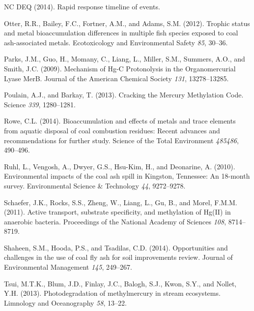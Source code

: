 \documentclass[ms]{uncgdissertationexp}
\theoremstyle{plain}
\theoremstyle{definition}
\theoremstyle{remark}
\begin{document}
  \hypertarget{ref-ncdeqRapidResponseTimeline2014}{}
  NC DEQ (2014). Rapid response timeline of events.
  
  \hypertarget{ref-otterTrophicStatusMetal2012}{}
  Otter, R.R., Bailey, F.C., Fortner, A.M., and Adams, S.M. (2012).
  Trophic status and metal bioaccumulation differences in multiple fish
  species exposed to coal ash-associated metals. Ecotoxicology and
  Environmental Safety \emph{85}, 30--36.
  
  \hypertarget{ref-parksMechanismHgProtonolysis2009}{}
  Parks, J.M., Guo, H., Momany, C., Liang, L., Miller, S.M., Summers,
  A.O., and Smith, J.C. (2009). Mechanism of Hg-C Protonolysis in the
  Organomercurial Lyase MerB. Journal of the American Chemical Society
  \emph{131}, 13278--13285.
  
  \hypertarget{ref-poulainCrackingMercuryMethylation2013}{}
  Poulain, A.J., and Barkay, T. (2013). Cracking the Mercury Methylation
  Code. Science \emph{339}, 1280--1281.
  
  \hypertarget{ref-roweBioaccumulationEffectsMetals2014}{}
  Rowe, C.L. (2014). Bioaccumulation and effects of metals and trace
  elements from aquatic disposal of coal combustion residues: Recent
  advances and recommendations for further study. Science of the Total
  Environment \emph{485486}, 490--496.
  
  \hypertarget{ref-ruhlEnvironmentalImpactsCoal2010}{}
  Ruhl, L., Vengosh, A., Dwyer, G.S., Hsu-Kim, H., and Deonarine, A.
  (2010). Environmental impacts of the coal ash spill in Kingston,
  Tennessee: An 18-month survey. Environmental Science \& Technology
  \emph{44}, 9272--9278.
  
  \hypertarget{ref-schaeferActiveTransportSubstrate2011}{}
  Schaefer, J.K., Rocks, S.S., Zheng, W., Liang, L., Gu, B., and Morel,
  F.M.M. (2011). Active transport, substrate specificity, and methylation
  of Hg(II) in anaerobic bacteria. Proceedings of the National Academy of
  Sciences \emph{108}, 8714--8719.
  
  \hypertarget{ref-shaheenOpportunitiesChallengesUse2014}{}
  Shaheen, S.M., Hooda, P.S., and Tsadilas, C.D. (2014). Opportunities and
  challenges in the use of coal fly ash for soil improvements review.
  Journal of Environmental Management \emph{145}, 249--267.
  
  \hypertarget{ref-tsuiPhotodegradationMethylmercuryStream2013}{}
  Tsui, M.T.K., Blum, J.D., Finlay, J.C., Balogh, S.J., Kwon, S.Y., and
  Nollet, Y.H. (2013). Photodegradation of methylmercury in stream
  ecosystems. Limnology and Oceanography \emph{58}, 13--22.
  
\end{document}
